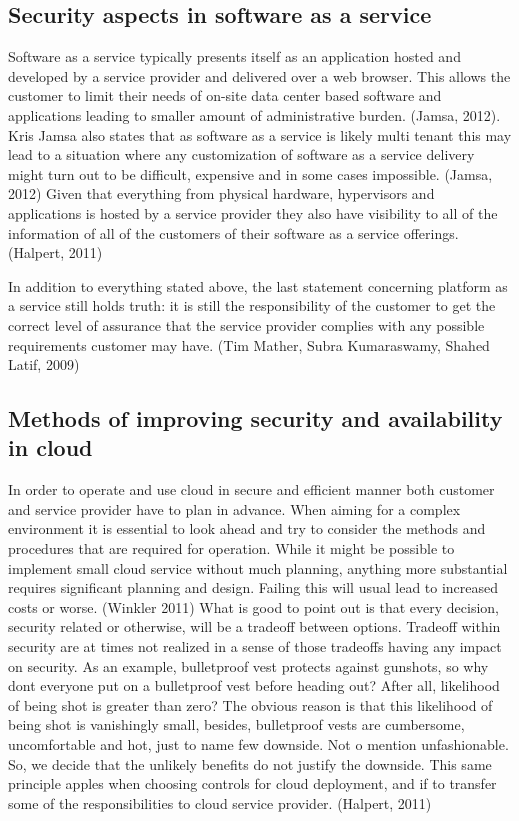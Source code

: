 \documentclass{article}
\begin{document}
\subsection{Security aspects in software as a service}
Software as a service typically presents itself as an application hosted and developed by a service provider and delivered over a web browser. This allows the customer to limit their needs of on-site data center based software and applications leading to smaller amount of administrative burden. (Jamsa, 2012). Kris Jamsa also states that as software as a service is likely multi tenant this may lead to a situation where any customization of software as a service delivery might turn out to be difficult, expensive and in some cases impossible. (Jamsa, 2012)
Given that everything from physical hardware, hypervisors and applications is hosted by a service provider they also have visibility to all of the information of all of the customers of their software as a service offerings. (Halpert, 2011)
\par
In addition to everything stated above, the last statement concerning platform as a service still holds truth: it is still the responsibility of the customer to get the correct level of assurance that the service provider complies with any possible requirements customer may have. (Tim Mather, Subra Kumaraswamy, Shahed Latif, 2009)
\subsection{Methods of improving security and availability in cloud}
In order to operate and use cloud in secure and efficient manner both customer and service provider have to plan in advance. When aiming for a complex environment it is essential to look ahead and try to consider the methods and procedures that are required for operation. While it might be possible to implement small cloud service without much planning, anything more substantial requires significant planning and design. Failing this will usual lead to increased costs or worse. (Winkler 2011)
What is good to point out is that every decision, security related or otherwise, will be a tradeoff between options. Tradeoff within security are at times not realized in a sense of those tradeoffs having any impact on security. As an example, bulletproof vest protects against gunshots, so why dont everyone put on a bulletproof vest before heading out? After all, likelihood of being shot is greater than zero? The obvious reason is that this likelihood of being shot is vanishingly small, besides, bulletproof vests are cumbersome, uncomfortable and hot, just to name few downside. Not o mention unfashionable. So, we decide that the unlikely benefits do not justify the downside. This same principle apples when choosing controls for cloud deployment, and if to transfer some of the responsibilities to cloud service provider. (Halpert, 2011)  
\end{document}
